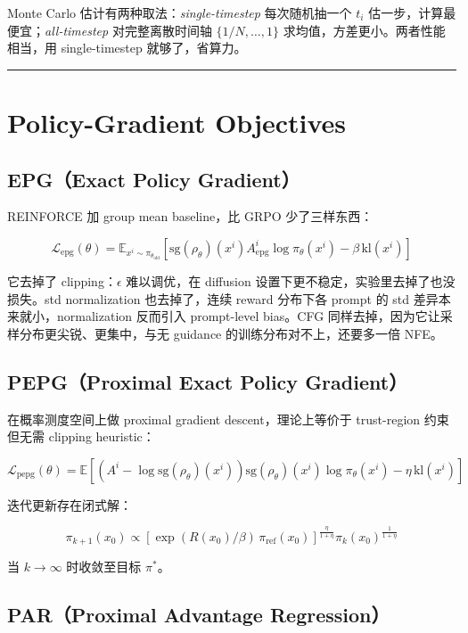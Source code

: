 Monte Carlo 估计有两种取法：\emph{single-timestep} 每次随机抽一个 \(t_i\) 估一步，计算最便宜；\emph{all-timestep} 对完整离散时间轴 \(\{1/N, \ldots, 1\}\) 求均值，方差更小。两者性能相当，用 single-timestep 就够了，省算力。

\hrule

\section{Policy-Gradient Objectives}

\subsection{EPG（Exact Policy Gradient）}

REINFORCE 加 group mean baseline，比 GRPO 少了三样东西：

\[
\mathcal{L}_\mathrm{epg}(\theta) = \mathbb{E}_{x^i \sim \pi_{\theta_\mathrm{old}}}\!\left[\mathrm{sg}(\rho_\theta)(x^i) A^i_\mathrm{epg} \log \pi_\theta(x^i) - \beta\, \mathrm{kl}(x^i)\right]
\]

它去掉了 clipping：\(\epsilon\) 难以调优，在 diffusion 设置下更不稳定，实验里去掉了也没损失。std normalization 也去掉了，连续 reward 分布下各 prompt 的 std 差异本来就小，normalization 反而引入 prompt-level bias。CFG 同样去掉，因为它让采样分布更尖锐、更集中，与无 guidance 的训练分布对不上，还要多一倍 NFE。

\subsection{PEPG（Proximal Exact Policy Gradient）}

在概率测度空间上做 proximal gradient descent，理论上等价于 trust-region 约束但无需 clipping heuristic：

\[
\mathcal{L}_\mathrm{pepg}(\theta) = \mathbb{E}\!\left[\left(A^i - \log \mathrm{sg}(\rho_\theta)(x^i)\right)\mathrm{sg}(\rho_\theta)(x^i)\log \pi_\theta(x^i) - \eta\, \mathrm{kl}(x^i)\right]
\]

迭代更新存在闭式解：

\[
\pi_{k+1}(x_0) \propto \left[\exp(R(x_0)/\beta)\,\pi_\mathrm{ref}(x_0)\right]^{\frac{\eta}{1+\eta}} \pi_k(x_0)^{\frac{1}{1+\eta}}
\]

当 \(k \to \infty\) 时收敛至目标 \(\pi^*\)。

\subsection{PAR（Proximal Advantage Regression）}

